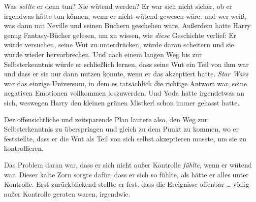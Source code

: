 Was \emph{sollte} er denn tun? Nie wütend werden? Er war sich nicht sicher, ob er irgendwas hätte tun können, wenn er nicht wütend gewesen wäre; und wer weiß, was dann mit Neville und seinen Büchern geschehen wäre. Außerdem hatte Harry genug Fantasy-Bücher gelesen, um zu wissen, wie \emph{diese} Geschichte verlief: Er würde versuchen, seine Wut zu unterdrücken, würde daran scheitern und sie würde wieder hervorbrechen. Und nach einem langen Weg bis zur Selbsterkenntnis würde er schließlich lernen, dass seine Wut ein Teil von ihm war und dass er sie nur dann nutzen konnte, wenn er das akzeptiert hatte. \emph{Star Wars} war das einzige Universum, in dem es tatsächlich die richtige Antwort war, seine negativen Emotionen vollkommen loszuwerden. Und Yoda hatte irgendetwas an sich, weswegen Harry den kleinen grünen Mistkerl schon immer gehasst hatte.

Der offensichtliche und zeitsparende Plan lautete also, den Weg zur Selbsterkenntnis zu überspringen und gleich zu dem Punkt zu kommen, wo er feststellte, dass er die Wut als Teil von sich selbst akzeptieren musste, um sie zu kontrollieren.

Das Problem daran war, dass er sich nicht außer Kontrolle \emph{fühlte}, wenn er wütend war. Dieser kalte Zorn sorgte dafür, dass er sich so fühlte, als hätte er alles unter Kontrolle. Erst zurückblickend stellte er fest, dass die Ereignisse offenbar … völlig außer Kontrolle geraten waren, irgendwie.

